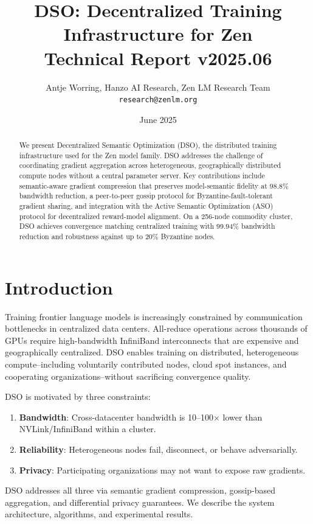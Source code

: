 \documentclass[11pt,a4paper]{article}
\title{\textbf{DSO: Decentralized Training Infrastructure for Zen}\\
\large Technical Report v2025.06}
\author{Antje Worring, Hanzo AI Research, Zen LM Research Team\\
\texttt{research@zenlm.org}}
\date{June 2025}
\begin{document}
\maketitle

\begin{abstract}
We present Decentralized Semantic Optimization (DSO), the distributed training
infrastructure used for the Zen model family. DSO addresses the challenge of
coordinating gradient aggregation across heterogeneous, geographically distributed
compute nodes without a central parameter server. Key contributions include
semantic-aware gradient compression that preserves model-semantic fidelity at 98.8\%
bandwidth reduction, a peer-to-peer gossip protocol for Byzantine-fault-tolerant
gradient sharing, and integration with the Active Semantic Optimization (ASO) protocol
for decentralized reward-model alignment. On a 256-node commodity cluster, DSO achieves
convergence matching centralized training with 99.94\% bandwidth reduction and robustness
against up to 20\% Byzantine nodes.
\end{abstract}

\section{Introduction}

Training frontier language models is increasingly constrained by communication bottlenecks
in centralized data centers. All-reduce operations across thousands of GPUs require
high-bandwidth InfiniBand interconnects that are expensive and geographically centralized.
DSO enables training on distributed, heterogeneous compute--including voluntarily
contributed nodes, cloud spot instances, and cooperating organizations--without
sacrificing convergence quality.

DSO is motivated by three constraints:
\begin{enumerate}
  \item \textbf{Bandwidth}: Cross-datacenter bandwidth is 10--100$\times$ lower than
    NVLink/InfiniBand within a cluster.
  \item \textbf{Reliability}: Heterogeneous nodes fail, disconnect, or behave adversarially.
  \item \textbf{Privacy}: Participating organizations may not want to expose raw gradients.
\end{enumerate}

DSO addresses all three via semantic gradient compression, gossip-based aggregation,
and differential privacy guarantees. We describe the system architecture, algorithms,
and experimental results.
\end{document}
